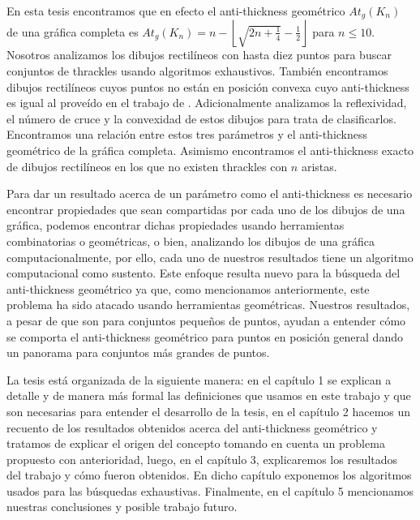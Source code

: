 En esta tesis encontramos que en efecto el anti-thickness geométrico $At_g(K_n)$ de una gráfica completa es
$At_g(K_n) = n - \left\lfloor\sqrt{2n + \frac{1}{4}}- \frac{1}{2}\right\rfloor$ para $n\leq 10$. Nosotros
analizamos los dibujos rectilíneos con hasta diez puntos para buscar conjuntos de thrackles usando
algoritmos exhaustivos. También encontramos dibujos rectilíneos cuyos puntos no están en posición convexa
cuyo anti-thickness es igual al proveído en el trabajo de \cite{Fabila-Monroy2018}. Adicionalmente
analizamos la reflexividad, el número de cruce y la convexidad de estos dibujos para trata de
clasificarlos. Encontramos una relación entre estos tres parámetros y el anti-thickness geométrico de la
gráfica completa. Asimismo encontramos el anti-thickness exacto de dibujos rectilíneos en los que no
existen thrackles con $n$ aristas.

Para dar un resultado acerca de un parámetro como el anti-thickness es necesario encontrar propiedades que
sean compartidas por cada uno de los dibujos de una gráfica, podemos encontrar dichas propiedades usando
herramientas combinatorias o geométricas, o bien, analizando los dibujos de una gráfica computacionalmente,
por ello, cada uno de nuestros resultados tiene un algoritmo computacional como sustento. Este enfoque
resulta nuevo para la búsqueda del anti-thickness geométrico ya que, como mencionamos anteriormente, este
problema ha sido atacado usando herramientas geométricas. Nuestros resultados, a pesar de que son para
conjuntos pequeños de puntos, ayudan a entender cómo se comporta el anti-thickness geométrico para puntos
en posición general dando un panorama para conjuntos más grandes de puntos.

La tesis está organizada de la siguiente manera: en el capítulo 1 se explican
a detalle y de manera más formal las definiciones que usamos en este trabajo y que
son necesarias para entender el desarrollo de la tesis, en el capítulo 2 hacemos un recuento de los
resultados obtenidos acerca del anti-thickness geométrico y tratamos de explicar el origen del concepto
tomando en cuenta un problema propuesto con anterioridad, luego, en el capítulo 3, explicaremos los
resultados del trabajo y cómo fueron obtenidos. En dicho capítulo exponemos los algoritmos usados para las
búsquedas exhaustivas. Finalmente, en el capítulo 5 mencionamos nuestras conclusiones y posible trabajo
futuro.
